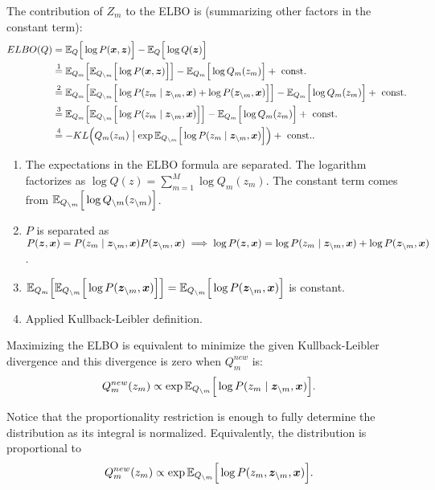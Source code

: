 The contribution of \(Z_{m}\) to the ELBO is (summarizing other factors in the constant term):
\[
  \begin{aligned}
    ELBO(Q) &= \mathbb{E}_{Q}\Big[\log{P(\bm{x}, \bm{z})}\Big] - \mathbb{E}_{Q}\Big[\log{Q(\bm{z})}\Big]\\
    &\stackrel{1}{=} \mathbb{E}_{Q_{m}}\Big[\mathbb{E}_{Q_{\backslash m}}\Big[\log{P(\bm{x}, \bm{z})}\Big]\Big] - \mathbb{E}_{Q_{m}}\Big[\log{Q_{m}(z_{m})}\Big] + \text{ const. }\\
    &\stackrel{2}{=} \mathbb{E}_{Q_{m}}\Big[\mathbb{E}_{Q_{\backslash m}}\Big[\log{P(z_{m} \mid \bm{z}_{\backslash m}, \bm{x})} + \log{P(\bm{z}_{\backslash m}, \bm{x})}\Big]\Big] - \mathbb{E}_{Q_{m}}\Big[\log{Q_{m}(z_{m})}\Big] + \text{ const. }\\
    &\stackrel{3}{=}  \mathbb{E}_{Q_{m}}\Big[\mathbb{E}_{Q_{\backslash m}}\Big[\log{P(z_{m} \mid \bm{z}_{\backslash m}, \bm{x})}\Big]\Big] - \mathbb{E}_{Q_{m}}\Big[\log{Q_{m}(z_{m})}\Big] + \text{ const. }\\
    &\stackrel{4}{=} - KL\Big(Q_{m}(z_{m}) \bigm|   \exp{\mathbb{E}_{Q_{\backslash m}}\Big[\log{P(z_{m} \mid \bm{z}_{\backslash m}, \bm{x})}\Big]} \Big) + \text{ const.}.
  \end{aligned}
\]

\begin{enumerate}
  \item The expectations in the ELBO formula are separated. The logarithm factorizes as \(\log Q(z) = \sum_{m=1}^M \log Q_m(z_m)\).  The constant term comes from \( \mathbb{E}_{Q_{\backslash m}}\Big[\log Q_{\backslash m}(z_{\backslash m})\Big] \).
  \item \( P \) is separated as \( P(\bm{z}, \bm{x}) = P(z_m \mid \bm{z}_{\backslash m}, \bm{x})P(\bm{z}_{\backslash m}, \bm{x}) \implies \log P(\bm{z}, \bm{x}) = \log P(z_m \mid \bm{z}_{\backslash m}, \bm{x}) + \log P(\bm{z}_{\backslash m}, \bm{x})\).
  \item \( \mathbb{E}_{Q_{m}}\Big[\mathbb{E}_{Q_{\backslash m}}\Big[\log{P(\bm{z}_{\backslash m}, \bm{x})}\Big]\Big] = \mathbb{E}_{Q_{\backslash m}}\Big[\log{P(\bm{z}_{\backslash m}, \bm{x})}\Big]\) is constant.
  \item Applied Kullback-Leibler definition.
\end{enumerate}

Maximizing the ELBO is equivalent to minimize the given Kullback-Leibler divergence and this divergence is zero when \(Q_{m}^{new}\) is:
\[
  Q_{m}^{new}(z_{m}) \propto \exp{\mathbb{E}_{Q_{\backslash m}}\Big[\log{P(z_{m} \mid \bm{z}_{\backslash m}, \bm{x})}\Big]}.
\]

Notice that the proportionality restriction is enough to fully determine the distribution as its integral is normalized. Equivalently, the distribution is proportional to
\begin{equation}\label{eq:cavi_update}
    Q_{m}^{new}(z_{m}) \propto \exp{\mathbb{E}_{Q_{\backslash m}}\Big[\log{P(z_{m}, \bm{z}_{\backslash m}, \bm{x})}\Big]}.
\end{equation}

